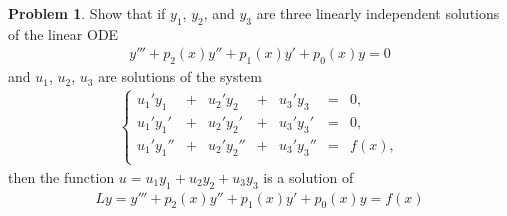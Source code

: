 \documentclass[12pt]{article}
\theoremstyle{definition}
\newtheorem{problem}{Problem}
\begin{document}
\begin{problem}
  Show that if $y_1$, $y_2$, and $y_3$ are three linearly independent solutions
  of the linear ODE
  \begin{align*}
    y''' + p_2(x)y'' + p_1(x)y' + p_0(x) y = 0
  \end{align*}
  and $u_1$, $u_2$, $u_3$ are solutions of the system
  \begin{align}\label{u_system}
    \left\{
      \begin{array}{lllllll}
        u_1'y_1 &+& u_2'y_2 &+& u_3'y_3 &=& 0, \\
        u_1'y_1' &+& u_2'y_2' &+& u_3'y_3' &=& 0, \\
        u_1'y_1'' &+& u_2'y_2'' &+& u_3'y_3'' &=& f(x), \\
      \end{array}
    \right.
  \end{align}
  then the function $u = u_1 y_1 + u_2 y_2 + u_3 y_3$ is a solution of
  \begin{align*}
    Ly = y''' + p_2(x)y'' + p_1(x)y' + p_0(x) y = f(x)
  \end{align*}
\end{problem}
\end{document}
